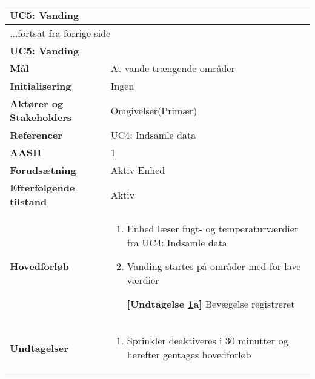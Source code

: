 \begin{center} \centering \label{UC5} 
	\begin{longtable}{|p{5cm}|p{9cm}|}  %
	\hline
		\multicolumn{2}{|l|}{\textbf{UC5: Vanding}} 		\\\hline %
		\endfirsthead
		
		\multicolumn{2}{l}{...fortsat fra forrige side} 	\\ \hline %
		\multicolumn{2}{|l|}{\textbf{UC5: Vanding}} 		\\\hline %
		\endhead	
		
		\textbf{Mål}								&At vande trængende områder	\\\hline
		\textbf{Initialisering}					&Ingen						\\\hline
		\textbf{Aktører og Stakeholders}			&Omgivelser(Primær)			\\\hline
		\textbf{Referencer}						&UC4: Indsamle data 			\\\hline
		\textbf{AASH}							&1							\\\hline
		\textbf{Forudsætning}					&Aktiv Enhed					\\\hline
		\textbf{Efterfølgende tilstand}			&Aktiv						\\\hline
		\textbf{Hovedforløb}					
			&\begin{enumerate}
				
				\item Enhed læser fugt- og temperaturværdier fra UC4: Indsamle data
				
				\item \label{uc5sprinkler} Vanding startes på områder med for lave værdier
				
					\textbf{[Undtagelse \ref{uc5sprinkler}a]} Bevægelse registreret
	
			\end{enumerate}\\\hline

		\textbf{Undtagelser}
			&\begin{enumerate}[label=\ref{uc5sprinkler}a.]
			
				\item Sprinkler deaktiveres i 30 minutter og herefter gentages hovedforløb	
			
			\end{enumerate}\\\hline
	\end{longtable}
\end{center}

